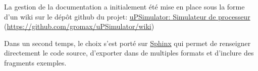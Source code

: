 La gestion de la documentation a initialement été mise en place sous la forme d'un wiki sur le dépôt github du projet: \href{https://github.com/gromax/uPSimulator/wiki}{uPSimulator: Simulateur de processeur} (\url{https://github.com/gromax/uPSimulator/wiki})

Dans un second temps, le choix s'est porté sur \href{https://www.sphinx-doc.org/en/master/index.html}{Sphinx} qui permet de renseigner directement le code source, d'exporter dans de multiples formats et d'inclure des fragments exemples.

